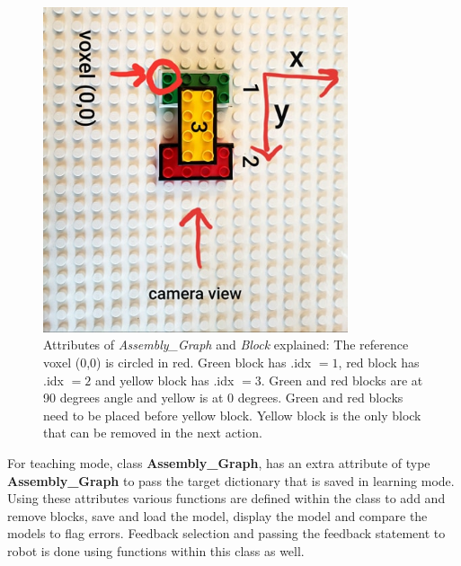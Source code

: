 \begin{figure}[h]
   \centering
   \includegraphics[width = 0.8\textwidth]{figures/voxel_3objs.jpg}
   \caption[{Attributes of \emph{Assembly\_Graph} and \emph{Block} explained}]{Attributes of \emph{Assembly\_Graph} and \emph{Block} explained: The reference voxel (0,0) is circled in red. Green block has .idx $=1$, red block has .idx $= 2$ and yellow block has .idx $= 3$. Green and red blocks are at 90 degrees angle and yellow is at 0 degrees. Green and red blocks need to be placed before yellow block. Yellow block is the only block that can be removed in the next action.}
   \label{fig:fig_3-2}
\end{figure}

For teaching mode, class \textbf{Assembly\_Graph}, has an extra attribute of type \textbf{Assembly\_Graph} to pass the target dictionary that is saved in learning mode. Using these attributes various functions are defined within the class to add and remove blocks, save and load the model, display the model and compare the models to flag errors. Feedback selection and passing the feedback statement to robot is done using functions within this class as well. 

